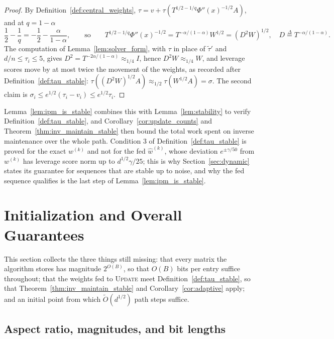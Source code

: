 \documentclass[11pt]{article}
\renewcommand{\O}{\widetilde O}
\newcommand{\what}{\widehat{w}}
\newcommand{\tautil}{\widetilde{\tau}}
\newcommand{\defeq}{\stackrel{\Delta}{=}}
\begin{document}
\begin{proof}
By Definition~\ref{def:central_weights},
$\tau = v + \tau(T^{1/2 - 1/q} \Phi''(x)^{-1/2} A)$, and at
$q = 1 - \alpha$
\[
\frac12 - \frac1q
=
- \frac12 - \frac{\alpha}{1 - \alpha},
\qquad\text{so}\qquad
T^{1/2 - 1/q} \Phi''(x)^{-1/2}
=
T^{-\alpha / (1 - \alpha)} W^{1/2}
=
\left( D^{2} W \right)^{1/2},
\quad
D \defeq T^{-\alpha / (1 - \alpha)} .
\]
The computation of Lemma~\ref{lem:solver_form}, with $\tau$ in place of
$\tautil'$ and
$d / n \le \tau_i \le 5$, gives
$D^{2} = T^{-2 \alpha / (1 - \alpha)} \approx_{1/4} I$, hence
$D^{2} W \approx_{1/4} W$, and leverage scores move by at most twice the
movement of the weights, as recorded after Definition~\ref{def:tau_stable}:
$\tau((D^{2} W)^{1/2} A) \approx_{1/2} \tau(W^{1/2} A) = \sigma$.
The second claim is $\sigma_i \le e^{1/2} (\tau_i - v_i) \le e^{1/2} \tau_i$.
\end{proof}

Lemma~\ref{lem:ipm_is_stable} combines this with Lemma~\ref{lem:stability} to
verify Definition~\ref{def:tau_stable}, and Corollary~\ref{cor:update_counts}
and Theorem~\ref{thm:inv_maintain_stable} then bound the total work spent on
inverse maintenance over the whole path.
Condition 3 of Definition~\ref{def:tau_stable} is proved for the exact $w^{(k)}$
and not for the fed $\what^{(k)}$, whose deviation
$e^{\pm \gamma / 50}$ from
$w^{(k)}$ has leverage score norm up to
$d^{1/2} \gamma / 25$; this is why Section~\ref{sec:dynamic} states its
guarantee for sequences that are stable up to noise, and why the fed sequence
qualifies is the last step of Lemma~\ref{lem:ipm_is_stable}.

\section{Initialization and Overall Guarantees}
\label{sec:overall}

This section collects the three things still missing: that every matrix the
algorithm stores has magnitude $2^{O(B)}$, so that
$O(B)$ bits per entry suffice throughout; that the weights fed to
\textsc{Update} meet Definition~\ref{def:tau_stable}, so that
Theorem~\ref{thm:inv_maintain_stable} and Corollary~\ref{cor:adaptive} apply;
and an initial point from which $\O(d^{1/2})$ path steps suffice.

\subsection{Aspect ratio, magnitudes, and bit lengths}
\label{subsec:magnitudes}
\end{document}
